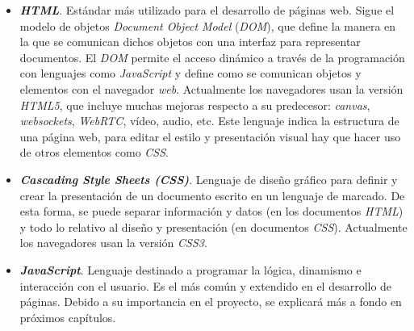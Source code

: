 \begin{itemize}
    \item \textit{\textbf{HTML}}. Estándar más utilizado para el desarrollo de páginas web. Sigue el modelo de objetos \textit{Document Object Model} (\textit{DOM}), que define la manera en la que se comunican dichos objetos con una interfaz para representar documentos. El \textit{DOM} permite el acceso dinámico a través de la programación con lenguajes como \textit{JavaScript} y define como se comunican objetos y elementos con el navegador \textit{web}.
    Actualmente los navegadores usan la versión \textit{HTML5}, que incluye muchas mejoras respecto a su predecesor: \textit{canvas}, \textit{websockets}, \textit{WebRTC}, vídeo, audio, etc. Este lenguaje indica la estructura de una página web, para editar el estilo y presentación visual hay que hacer uso de otros elementos como \textit{CSS}.
    \item \textit{\textbf{Cascading Style Sheets (CSS)}}. Lenguaje de diseño gráfico para definir y crear la presentación de un documento escrito en un lenguaje de marcado. De esta forma, se puede separar información y datos (en los documentos \textit{HTML}) y todo lo relativo al diseño y presentación (en documentos \textit{CSS}). Actualmente los navegadores usan la versión \textit{CSS3}.
    \item \textit{\textbf{JavaScript}}. Lenguaje destinado a programar la lógica, dinamismo e interacción con el usuario. Es el más común y extendido en el desarrollo de páginas. Debido a su importancia en el proyecto, se explicará más a fondo en próximos capítulos.
\end{itemize}

